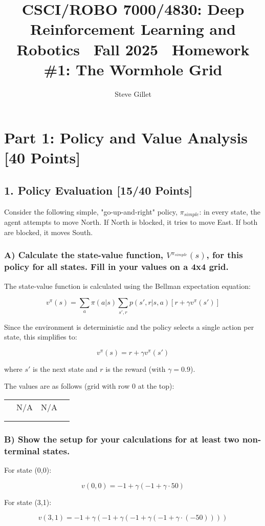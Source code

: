 \documentclass{article}
\title{CSCI/ROBO 7000/4830: Deep Reinforcement Learning and Robotics \ Fall 2025 \ Homework \#1: The Wormhole Grid}
\author{Steve Gillet}
\begin{document}
\maketitle
\section*{Part 1: Policy and Value Analysis [40 Points]}

\subsection*{1. Policy Evaluation [15/40 Points]}

Consider the following simple, "go-up-and-right" policy, $\pi_{simple}$: in every state, the agent attempts to move North. If North is blocked, it tries to move East. If both are blocked, it moves South.

\subsubsection*{A) Calculate the state-value function, $V^{\pi_{simple}}(s)$, for this policy for all states. Fill in your values on a 4x4 grid.}

The state-value function is calculated using the Bellman expectation equation:

\[
v^\pi(s) = \sum_a \pi(a|s) \sum_{s',r} p(s',r|s,a) \left[ r + \gamma v^\pi(s') \right]
\]

Since the environment is deterministic and the policy selects a single action per state, this simplifies to:

\[
v^\pi(s) = r + \gamma v^\pi(s')
\]

where $s'$ is the next state and $r$ is the reward (with $\gamma = 0.9$).

The values are as follows (grid with row 0 at the top):

\begin{center}
\begin{tabular}{|c|c|c|c|}
\hline
 &  &  &  \\
\hline
 & N/A & N/A &  \\
\hline
 &  &  &  \\
\hline
 &  &  &  \\
\hline
\end{tabular}
\end{center}

\subsubsection*{B) Show the setup for your calculations for at least two non-terminal states.}

For state (0,0):

\[
v(0,0) = -1 + \gamma \left( -1 + \gamma \cdot 50 \right)
\]

For state (3,1):

\[
v(3,1) = -1 + \gamma \left( -1 + \gamma \left( -1 + \gamma \left( -1 + \gamma \cdot (-50) \right) \right) \right)
\]
\end{document}
